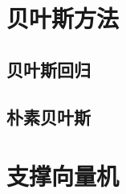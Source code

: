 

\section{贝叶斯方法} %
\label{sec:贝叶斯方法}

\subsection{贝叶斯回归} %
\label{sub:贝叶斯回归}


\subsection{朴素贝叶斯} %
\label{sub:朴素贝叶斯}






\section{支撑向量机} %
\label{sec:支撑向量机}



